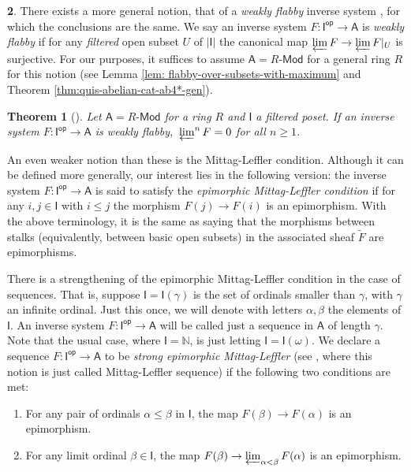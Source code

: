 \documentclass[reqno,11pt]{amsart}
\theoremstyle{plain}
\newtheorem{thm}{Theorem}[section]
\theoremstyle{remark}
\theoremstyle{definition}
\newtheorem{cosa}[thm]{}
\numberwithin{equation}{thm}
\newcommand{\SA}{\mathsf{A}}
\newcommand{\SI}{\mathsf{I}}
\newcommand{\NN}{\mathbb{N}}
\newcommand{\md}{\text{-}\mathsf{Mod}}
\newcommand{\op}{\mathsf{op}}
\begin{document}
\begin{cosa}
		There exists a more general notion, that of a \textit{weakly flabby} inverse system \cite[p. 6]{jensen}, for which the conclusions are the same. We say an inverse system $F \colon \SI^\op \to \SA$ is \textit{weakly flabby} if for any \textit{filtered} open subset $U$ of $|\SI|$ the canonical map $\varprojlim F \to \varprojlim F\vert_U$ is surjective. For our purposes, it suffices to assume $\SA = R\md$ for a general ring $R$ for this notion (see Lemma \ref{lem: flabby-over-subsets-with-maximum} and Theorem \ref{thm:quis-abelian-cat-ab4*-gen}). 
		
		\begin{thm}[{\cite[Théorème 1.8.]{jensen}}]\label{thm: jensen-weakly-flabby}
			Let $\SA = R\md$ for a ring $R$ and $\SI$ a filtered poset. If an inverse system $F \colon \SI^\op \to \SA$ is weakly flabby, $\sideset{}{^{n}}\varprojlim F = 0$ for all $n \geq 1$.
		\end{thm}
		
		An even weaker notion than these is the Mittag-Leffler condition. Although it can be defined more generally, our interest lies in the following version: the inverse system $F \colon \SI^\op \to \SA$ is said to satisfy the \textit{epimorphic Mittag-Leffler condition} if for any $i, j \in \SI$ with $i \leq j$ the morphism $F(j) \to F(i)$ is an epimorphism. With the above terminology, it is the same as saying that the morphisms between stalks (equivalently, between basic open subsets) in the associated sheaf $\tilde{F}$ are epimorphisms. 
		
		There is a strengthening of the epimorphic Mittag-Leffler condition in the case of sequences. That is, suppose $\SI = \SI(\gamma)$ is the set of ordinals smaller than $\gamma$, with $\gamma$ an infinite ordinal. Just this once, we will denote with letters $\alpha, \beta$ the elements of $\SI$. An inverse system $F \colon \SI^\op \to \SA$ will be called just a sequence in $\SA$ of length $\gamma$. Note that the usual case, where $\SI = \NN$, is just letting $\SI = \SI(\omega)$. We declare a sequence $F \colon \SI^\op \to \SA$ to be \emph{strong epimorphic Mittag-Leffler} (see \cite[Definition A.3.10.]{Ntc}, where this notion is just called Mittag-Leffler sequence) if the following two conditions are met:
		\begin{enumerate}
			\item[(\romannumeral 1)] For any pair of ordinals $\alpha \leq \beta$ in $\SI$, the map $F(\beta) \to F(\alpha)$ is an epimorphism.
			\item[(\romannumeral 2)] For any limit ordinal $\beta \in \SI$, the map $F(\beta) \to \varprojlim_{\alpha < \beta} F(\alpha)$ is an epimorphism.
		\end{enumerate}
		

\end{cosa}
\end{document}
